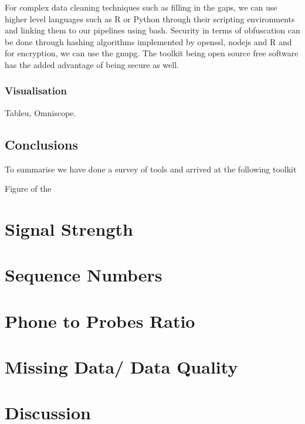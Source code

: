 For complex data cleaning techniques such as filling in the gaps, we can use higher level languages such as R or Python through their scripting environments and linking them to our pipelines using bash.
Security in terms of obfuscation can be done through hashing algorithms implemented by openssl, nodejs and R and for encryption, we can use the gnupg.
The toolkit being open source free software has the added advantage of being secure as well.

\subsubsection{Visualisation}

Tableu, Omniscope.

\subsection{Conclusions}

To summarise we have done a survey of tools and arrived at the following toolkit

Figure of the 


\section{Signal Strength}

\section{Sequence Numbers}

\section{Phone to Probes Ratio}

\section{Missing Data/ Data Quality}

\section{Discussion}


